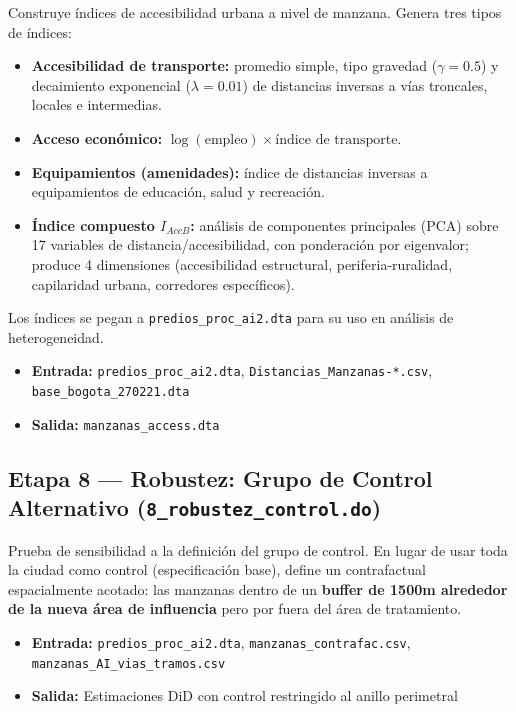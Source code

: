 \documentclass[12pt, a4paper]{article}
\begin{document}
Construye índices de accesibilidad urbana a nivel de manzana. Genera tres tipos de índices:

\begin{itemize}
  \item \textbf{Accesibilidad de transporte:} promedio simple, tipo gravedad ($\gamma=0.5$) y decaimiento exponencial ($\lambda=0.01$) de distancias inversas a vías troncales, locales e intermedias.
  \item \textbf{Acceso económico:} $\log(\text{empleo}) \times \text{índice de transporte}$.
  \item \textbf{Equipamientos (amenidades):} índice de distancias inversas a equipamientos de educación, salud y recreación.
  \item \textbf{Índice compuesto $I_{AccB}$:} análisis de componentes principales (PCA) sobre 17 variables de distancia/accesibilidad, con ponderación por eigenvalor; produce 4 dimensiones (accesibilidad estructural, periferia-ruralidad, capilaridad urbana, corredores específicos).
\end{itemize}

Los índices se pegan a \texttt{predios\_proc\_ai2.dta} para su uso en análisis de heterogeneidad.

\begin{itemize}
  \item \textbf{Entrada:} \texttt{predios\_proc\_ai2.dta}, \texttt{Distancias\_Manzanas-*.csv}, \texttt{base\_bogota\_270221.dta}
  \item \textbf{Salida:} \texttt{manzanas\_access.dta}
\end{itemize}

\subsection{Etapa 8 — Robustez: Grupo de Control Alternativo (\texttt{8\_robustez\_control.do})}

Prueba de sensibilidad a la definición del grupo de control. En lugar de usar toda la ciudad como control (especificación base), define un contrafactual espacialmente acotado: las manzanas dentro de un \textbf{buffer de 1500m alrededor de la nueva área de influencia} pero por fuera del área de tratamiento.

\begin{itemize}
  \item \textbf{Entrada:} \texttt{predios\_proc\_ai2.dta}, \texttt{manzanas\_contrafac.csv}, \texttt{manzanas\_AI\_vias\_tramos.csv}
  \item \textbf{Salida:} Estimaciones DiD con control restringido al anillo perimetral
\end{itemize}
\end{document}
